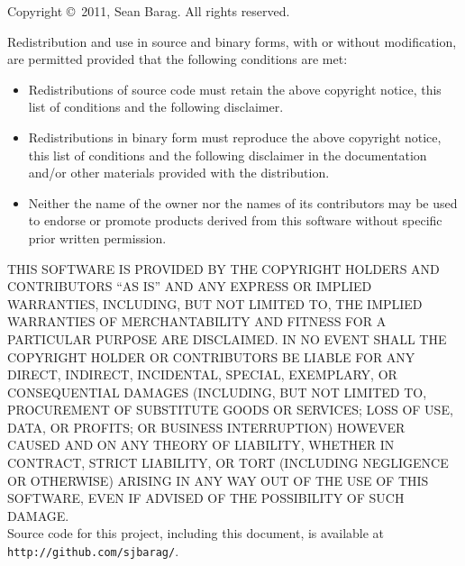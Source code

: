 Copyright \copyright\ 2011, Sean Barag.  All rights reserved.

Redistribution and use in source and binary forms, with or without
modification, are permitted provided that the following conditions are met:
\begin{itemize}
\item Redistributions of source code must retain the above copyright notice, this
  list of conditions and the following disclaimer.
\item Redistributions in binary form must reproduce the above copyright notice, this
  list of conditions and the following disclaimer in the documentation and/or
  other materials provided with the distribution.
\item Neither the name of the owner nor the names of its contributors may be
  used to endorse or promote products derived from this software without specific
  prior written permission.
\end{itemize}

THIS SOFTWARE IS PROVIDED BY THE COPYRIGHT HOLDERS AND CONTRIBUTORS ``AS IS'' AND
ANY EXPRESS OR IMPLIED WARRANTIES, INCLUDING, BUT NOT LIMITED TO, THE IMPLIED
WARRANTIES OF MERCHANTABILITY AND FITNESS FOR A PARTICULAR PURPOSE ARE
DISCLAIMED. IN NO EVENT SHALL THE COPYRIGHT HOLDER OR CONTRIBUTORS BE LIABLE
FOR ANY DIRECT, INDIRECT, INCIDENTAL, SPECIAL, EXEMPLARY, OR CONSEQUENTIAL
DAMAGES (INCLUDING, BUT NOT LIMITED TO, PROCUREMENT OF SUBSTITUTE GOODS OR
SERVICES; LOSS OF USE, DATA, OR PROFITS; OR BUSINESS INTERRUPTION) HOWEVER
CAUSED AND ON ANY THEORY OF LIABILITY, WHETHER IN CONTRACT, STRICT LIABILITY,
OR TORT (INCLUDING NEGLIGENCE OR OTHERWISE) ARISING IN ANY WAY OUT OF THE USE
OF THIS SOFTWARE, EVEN IF ADVISED OF THE POSSIBILITY OF SUCH DAMAGE.\\

Source code for this project, including this document, is available at
\texttt{http://github.com/sjbarag/}.

